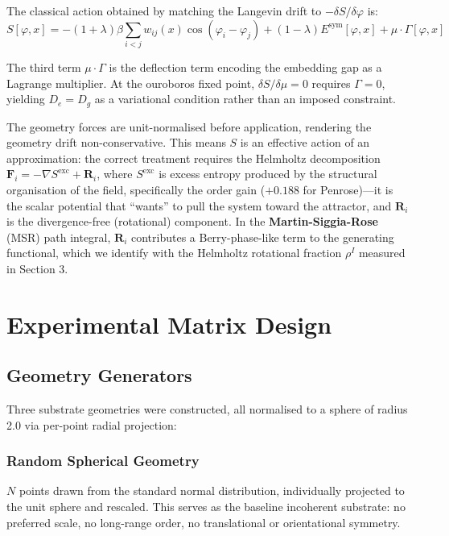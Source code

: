 \documentclass[11pt,a4paper]{article}
\begin{document}
The classical action obtained by matching the Langevin drift to $-\delta S/\delta\varphi$ is:
\begin{equation}
S[\varphi, x] = -(1+\lambda)\beta \sum_{i<j} w_{ij}(x) \cos(\varphi_i-\varphi_j) + (1-\lambda) E^{\text{sym}}[\varphi,x] + \mu \cdot \Gamma[\varphi,x]
\end{equation}

The third term $\mu \cdot \Gamma$ is the deflection term encoding the embedding gap as a Lagrange multiplier. At the ouroboros fixed point, $\delta S / \delta \mu = 0$ requires $\Gamma = 0$, yielding $D_e = D_g$ as a variational condition rather than an imposed constraint.

The geometry forces are unit-normalised before application, rendering the geometry drift non-conservative. This means $S$ is an effective action of an approximation: the correct treatment requires the Helmholtz decomposition $\mathbf{F}_i = -\nabla S^{\text{exc}} + \mathbf{R}_i$, where $S^{\text{exc}}$ is excess entropy produced by the structural organisation of the field, specifically the order gain ($+0.188$ for Penrose)---it is the scalar potential that ``wants'' to pull the system toward the attractor, and $\mathbf{R}_i$ is the divergence-free (rotational) component. In the \textbf{Martin-Siggia-Rose} (MSR) path integral, $\mathbf{R}_i$ contributes a Berry-phase-like term to the generating functional, which we identify with the Helmholtz rotational fraction $\rho^I$ measured in Section 3.

\section{Experimental Matrix Design}

\subsection{Geometry Generators}

Three substrate geometries were constructed, all normalised to a sphere of radius 2.0 via per-point radial projection:

\subsubsection{Random Spherical Geometry}

$N$ points drawn from the standard normal distribution, individually projected to the unit sphere and rescaled. This serves as the baseline incoherent substrate: no preferred scale, no long-range order, no translational or orientational symmetry.
\end{document}
